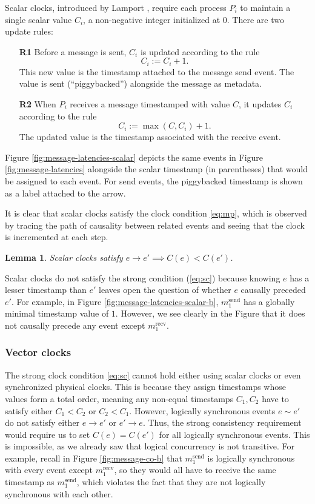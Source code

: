 \documentclass[]             %
{NASA}                       %
\newtheorem{lemma}[theorem]{Lemma}
\theoremstyle{definition}
\begin{document}
Scalar clocks, introduced by Lamport \cite{1978:lamportclocks},
require each process $P_i$ to maintain a single scalar value $C_i$, a
non-negative integer initialized at $0$. There are two update rules:
\begin{enumerate}
\item[\textbf{R1}] Before a message is sent, $C_i$ is updated according to the rule
  \[C_i := C_i + 1.\] This new value is the timestamp attached to the
  message send event. The value is sent (``piggybacked'') alongside
  the message as metadata.
\item[\textbf{R2}] When $P_i$ receives a message timestamped with value $C$, it
  updates $C_i$ according to the rule
  \[C_i := \max(C, C_i) + 1.\]
  The updated value is the timestamp associated with the receive
  event.
\end{enumerate}
Figure \ref{fig:message-latencies-scalar} depicts the same events in
Figure \ref{fig:message-latencies} alongside the scalar timestamp (in
parentheses) that would be assigned to each event. For send events,
the piggybacked timestamp is shown as a label attached to the arrow.

It is clear that scalar clocks satisfy the clock condition
\eqref{eq:mp}, which is observed by tracing the path of causality
between related events and seeing that the clock is incremented at
each step.
\begin{lemma}
  Scalar clocks satisfy $e \to e' \implies C(e) < C(e')$.
\end{lemma}

Scalar clocks do not satisfy the strong condition (\ref{eq:sc})
because knowing $e$ has a lesser timestamp than $e'$ leaves open the
question of whether $e$ causally preceded $e'$. For example, in Figure
\ref{fig:message-latencies-scalar-b}, $m_1^\textrm{send}$ has a
globally minimal timestamp value of $1$. However, we see clearly in
the Figure that it does not causally precede any event except
$m_1^\textrm{recv}$.

\subsubsection{Vector clocks}
\newcommand{\vt}{\textrm{vt}}

The strong clock condition \eqref{eq:sc} cannot hold either using
scalar clocks or even synchronized physical clocks. This is because
they assign timestamps whose values form a total order, meaning any
non-equal timestamps $C_1, C_2$ have to satisfy either $C_1 < C_2$ or
$C_2 < C_1$. However, logically synchronous events $e \sim e'$ do not
satisfy either $e \to e'$ or $e' \to e$. Thus, the strong consistency
requirement would require us to set $C(e) = C(e')$ for all logically
synchronous events. This is impossible, as we already saw that logical
concurrency is not transitive. For example, recall in Figure
\ref{fig:message-co-b} that $m_1^{\textrm{send}}$ is logically
synchronous with every event except $m_1^\textrm{recv}$, so they would
all have to receive the same timestamp as $m_1^{\textrm{send}}$, which
violates the fact that they are not logically synchronous with each
other.
\end{document}
